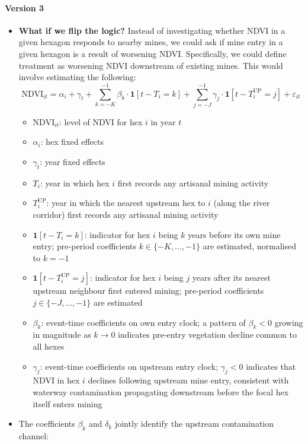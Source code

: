 \documentclass[12pt]{article}
\begin{document}
\paragraph{Version 3}
\begin{itemize}
    \item \textbf{What if we flip the logic?} Instead of investigating whether NDVI in a given hexagon responds to nearby mines, we could ask if mine entry in a given hexagon is a result of worsening NDVI. Specifically, we could define treatment as worsening NDVI downstream of existing mines. This would involve estimating the following:
\begin{equation}
\text{NDVI}_{it} = \alpha_i + \gamma_t + \sum_{k=-K}^{-1} \beta_k \cdot \mathbf{1}[t - T_i = k] + \sum_{j=-J}^{-1} \gamma_j \cdot \mathbf{1}[t - T_i^{\text{UP}} = j] + \varepsilon_{it}
\end{equation}

\begin{itemize}
    \item $\text{NDVI}_{it}$: level of NDVI for hex $i$ in year $t$
    \item $\alpha_i$: hex fixed effects
    \item $\gamma_t$: year fixed effects
    \item $T_i$: year in which hex $i$ first records any artisanal mining activity
    \item $T_i^{\text{UP}}$: year in which the nearest upstream hex to $i$ (along the river corridor) first records any artisanal mining activity
    \item $\mathbf{1}[t - T_i = k]$: indicator for hex $i$ being $k$ years before its own mine entry; pre-period coefficients $k \in \{-K, \ldots, -1\}$ are estimated, normalised to $k = -1$
    \item $\mathbf{1}[t - T_i^{\text{UP}} = j]$: indicator for hex $i$ being $j$ years after its nearest upstream neighbour first entered mining; pre-period coefficients $j \in \{-J, \ldots, -1\}$ are estimated
    \item $\beta_k$: event-time coefficients on own entry clock; a pattern of $\beta_k < 0$ growing in magnitude as $k \to 0$ indicates pre-entry vegetation decline common to all hexes
    \item $\gamma_j$: event-time coefficients on upstream entry clock; $\gamma_j < 0$ indicates that NDVI in hex $i$ declines following upstream mine entry, consistent with waterway contamination propagating downstream before the focal hex itself enters mining
\end{itemize}
\item The coefficients $\beta_k$ and $\delta_k$ jointly identify the upstream contamination channel:


\end{itemize}
\end{document}

